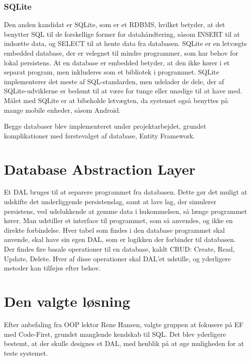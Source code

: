 \subsubsection*{SQLite}
Den anden kandidat er SQLite, som er et \ac{RDBMS}, hvilket betyder, at det benytter \ac{SQL} til de forskellige former for datahåndtering, såsom INSERT til at indsætte data, og SELECT til at hente data fra databasen.
SQLite er en letvægts embedded database, der er velegnet til mindre programmer, som har behov for lokal persistens.
At en database er embedded betyder, at den ikke kører i et separat program, men inkluderes som et bibliotek i programmet.
SQLite implementerer det meste af SQL-standarden, men udelader de dele, der af SQLite-udviklerne er bedømt til at være for tunge eller unødige til at have med.
Målet med SQLite er at bibeholde letvægten, da systemet også benyttes på mange mobile enheder, såsom Android.

Begge databaser blev implementeret under projektarbejdet, grundet komplikationer med førstevalget af database, Entity Framework. 


\section{Database Abstraction Layer}
Et \ac{DAL} bruges til at separere programmet fra databasen.
Dette gør det muligt at udskifte det underliggende persistenslag, samt at lave lag, der simulerer persistens, ved udelukkende at gemme data i hukommelsen, så længe programmet kører.
Man udstiller et interface til programmet, som så anvendes, og ikke en direkte forbindelse.
Hver tabel som findes i den database programmet skal anvende, skal have sin egen \ac{DAL}, som er logikken der forbinder til databasen.
Der findes fire basale operationer til en database, kaldt CRUD: Create, Read, Update, Delete. 
Hver af disse operationer skal DAL'et udstille, og yderligere metoder kan tilføjes efter behov.

\section{Den valgte løsning}

Efter anbefaling fra OOP lektor Rene Hansen, valgte gruppen at fokusere på \acl{EF} med Code-First, grundet manglende kendskab til \ac{SQL}. 
Det blev yderligere bestemt, at der skulle designes et \ac{DAL}, med henblik på at øge muligheden for at teste systemet.

